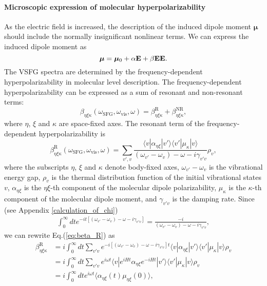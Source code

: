 \paragraph{Microscopic expression of molecular hyperpolarizability} 
As the electric field is increased, the description of the induced dipole moment 
$\boldsymbol \mu$ should include the normally insignificant nonlinear terms. We can express the induced dipole moment as
\begin{equation}
  {\boldsymbol \mu} = {\boldsymbol \mu}_0 +\alpha {\bf E} + \beta {\bf E E}.
\label{eq:induced_mu}
\end{equation}
The VSFG spectra are determined by the frequency-dependent hyperpolarizability in molecular level description. 
The frequency-dependent hyperpolarizability can be expressed as a sum of resonant and non-resonant terms:
\begin{equation}
\beta_{\eta\xi\kappa}(\omega_{\text{SFG}},\omega_{\text{vis}},\omega)=\beta_{\eta\xi\kappa}^{\text{R}}+\beta_{\eta\xi\kappa}^{\text{NR}},
\label{eq:beta}
\end{equation}
where $\eta$, $\xi$ and $\kappa$ are space-fixed axes.
The resonant term of the frequency-dependent hyperpolarizability is 
\begin{equation}
  \beta_{\eta\xi\kappa}^{\text{R}}(\omega_{\text{SFG}},\omega_{\text{vis}},\omega)=\sum_{v',v}\frac{\langle v|\alpha_{\eta\xi}|v'\rangle\langle v'|\mu_{\kappa}|v\rangle}{(\omega_{v'}-\omega_v)-\omega-i\gamma_{v'v}}\rho_v,
\label{eq:beta_R}
\end{equation}
where the subscripts $\eta$, $\xi$ and $\kappa$ denote body-fixed axes,
$\omega_{v'}-\omega_v$ is the vibrational energy gap, 
$\rho_v$ is the thermal distribution function of the initial vibrational states $v$,
$\alpha_{\eta\xi}$ is the $\eta\xi$-th component of the molecular dipole polarizability,
$\mu_{\kappa}$ is the $\kappa$-th component of the molecular dipole moment,
and $\gamma_{v'v}$ is the damping rate.
Since  
(see Appendix \ref{calculation_of_chi}) 
\begin{align}
\int_0^\infty dt e^{-it[(\omega_{v'}-\omega_v)-\omega-i\gamma_{v'v}]}=\frac{-i}{(\omega_{v'}-\omega_v)-\omega-i\gamma_{v'v}},
\label{integral_identity1a}
\end{align}
we can rewrite Eq.\thinspace(\ref{eq:beta_R}) as 
\begin{align}
  \beta_{\eta\xi\kappa}^{\text{R}}&=i\int_0^\infty dt \sum_{v'v}e^{-i[(\omega_{v'}-\omega_v)-\omega-i\gamma_{v'v}]t} \langle v|\alpha_{\eta\xi}|v'\rangle\langle v'|\mu_{\kappa}|v\rangle \rho_v \nonumber\\
   &=i\int_0^\infty dt \sum_{v'v}e^{i\omega t} \langle v|e^{iHt}\alpha_{\eta\xi}e^{-iHt}|v'\rangle\langle v'|\mu_{\kappa}|v\rangle \rho_v \nonumber\\
   &=i\int_0^\infty dt e^{i\omega t} \langle\alpha_{\eta\xi}(t)\mu_{\eta\xi}(0)\rangle,
\label{eq:beta_R_b}
\end{align}

